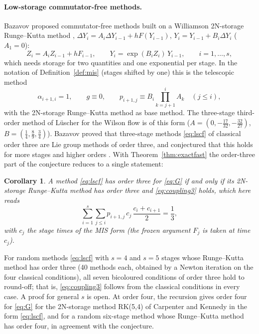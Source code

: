 \documentclass[11pt,a4paper]{article}
\newtheorem{corollary}[theorem]{Corollary}
\theoremstyle{definition}
\theoremstyle{remark}
\begin{document}
\paragraph{Low-storage commutator-free methods.}
Bazavov \cite{Bazavov2022} proposed commutator-free methods built on a Williamson 2N-storage Runge--Kutta method
\cite{Williamson1980}, $\Delta Y_i=A_i\Delta Y_{i-1}+hF(Y_{i-1})$, $Y_i=Y_{i-1}+B_i\Delta Y_i$ ($A_1=0$):
\begin{equation}\label{eq:lscf}
 Z_i=A_iZ_{i-1}+hF_{i-1},\qquad Y_i=\exp(B_iZ_i)\,Y_{i-1},\qquad i=1,\dots,s,
\end{equation}
which needs storage for two quantities and one exponential per stage. In the notation of Definition~\ref{def:mis} (stages
shifted by one) this is the telescopic method
\[
 \alpha_{i+1,i}=1,\qquad g\equiv0,\qquad p_{i+1,j}\equiv B_i\prod_{k=j+1}^{i}A_k\quad(j\le i),
\]
with the 2N-storage Runge--Kutta method as base method. The three-stage third-order method of L\"uscher for the Wilson
flow \cite{Luescher2010} is of this form ($A=(0,-\tfrac{17}{32},-\tfrac{32}{27})$, $B=(\tfrac14,\tfrac89,\tfrac34)$).
Bazavov proved that three-stage methods \eqref{eq:lscf} of classical order three are Lie group methods of order three,
and conjectured that this holds for more stages and higher orders \cite{Bazavov2022,BazavovChuna2021}. With
Theorem~\ref{thm:exactfast} the order-three part of the conjecture reduces to a single statement:

\begin{corollary}\label{cor:lscf}
A method \eqref{eq:lscf} has order three for \eqref{eq:G} if and only if its 2N-storage Runge--Kutta method has order
three and \eqref{eq:coupling3} holds, which here reads
\[
 \sum_{i=1}^{s}\sum_{j\le i}p_{i+1,j}\,c_j\,\frac{c_i+c_{i+1}}2=\frac13,
\]
with $c_j$ the stage times of the MIS form (the frozen argument $F_j$ is taken at time $c_j$).
\end{corollary}

For random methods \eqref{eq:lscf} with $s=4$ and $s=5$ stages whose Runge--Kutta method has order three (40 methods each,
obtained by a Newton iteration on the four classical conditions), all seven bicoloured conditions of order three hold to
round-off; that is, \eqref{eq:coupling3} follows from the classical conditions in every case. A proof for general $s$ is
open. At order four, the recursion gives order four for \eqref{eq:G} for the 2N-storage method RK(5,4) of Carpenter and
Kennedy \cite{CarpenterKennedy1994} in the form \eqref{eq:lscf}, and for a random six-stage method whose Runge--Kutta
method has order four, in agreement with the conjecture.
\end{document}
